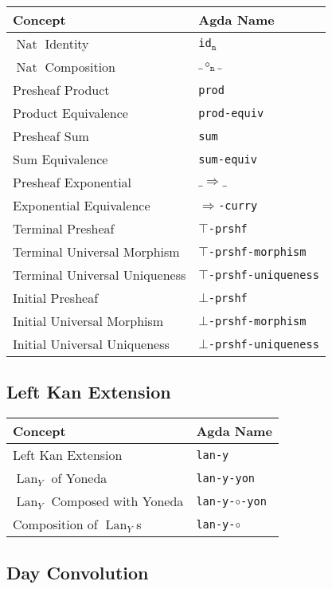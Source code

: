 \documentclass[12pt, parskip, DIV=14]{scrbook}
\renewcommand{\circ}{\vysmwhtcircle}
\newcommand{\Nat}{\operatorname{Nat}}
\newcommand{\Lan}{\operatorname{Lan}}
\begin{document}
\begin{center}
\begin{tabular}{ll}
  Concept & Agda Name \\
  \hline
  $\Nat$ Identity & \texttt{id$_\texttt{n}$} \\
  $\Nat$ Composition & $\_\circ_\texttt{n}\_$ \\
  Presheaf Product & \texttt{prod} \\
  Product Equivalence & \texttt{prod-equiv} \\
  Presheaf Sum & \texttt{sum} \\
  Sum Equivalence & \texttt{sum-equiv} \\
  Presheaf Exponential & $\_\Rightarrow\_$ \\
  Exponential Equivalence & \texttt{$\Rightarrow$-curry} \\
  Terminal Presheaf & \texttt{$\top$-prshf} \\
  Terminal Universal Morphism & \texttt{$\top$-prshf-morphism} \\
  Terminal Universal Uniqueness & \texttt{$\top$-prshf-uniqueness} \\
  Initial Presheaf & \texttt{$\bot$-prshf} \\
  Initial Universal Morphism & \texttt{$\bot$-prshf-morphism} \\
  Initial Universal Uniqueness & \texttt{$\bot$-prshf-uniqueness} \\
\end{tabular}
\end{center}

\subsection{Left Kan Extension}

\begin{center}
\begin{tabular}{ll}
  Concept & Agda Name \\
  \hline
  Left Kan Extension & \texttt{lan-y} \\
  $\Lan_Y$ of Yoneda & \texttt{lan-y-yon} \\
  $\Lan_Y$ Composed with Yoneda & \texttt{lan-y-$\circ$-yon} \\
  Composition of $\Lan_Y$s & \texttt{lan-y-$\circ$} \\
\end{tabular}
\end{center}

\subsection{Day Convolution}
\end{document}
